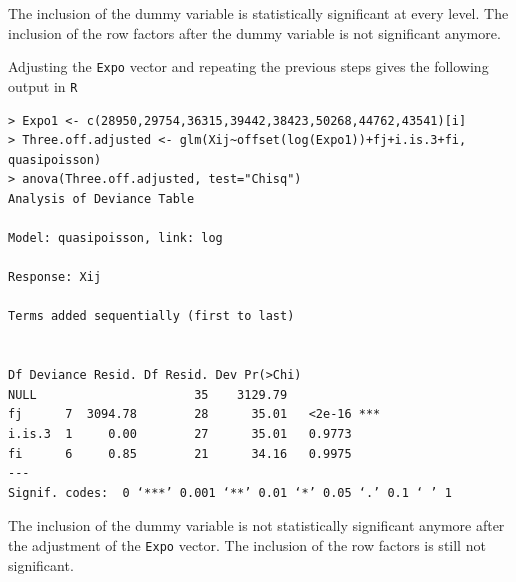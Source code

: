 \documentclass[11pt]{article}
\begin{document}
The inclusion of the dummy variable is statistically significant at every level. The inclusion of the row factors after the dummy variable is not significant anymore. 

Adjusting the \verb|Expo| vector and repeating the previous steps gives the following output in \verb|R|

\begin{verbatim}
> Expo1 <- c(28950,29754,36315,39442,38423,50268,44762,43541)[i]
> Three.off.adjusted <- glm(Xij~offset(log(Expo1))+fj+i.is.3+fi, quasipoisson)
> anova(Three.off.adjusted, test="Chisq")
Analysis of Deviance Table

Model: quasipoisson, link: log

Response: Xij

Terms added sequentially (first to last)


Df Deviance Resid. Df Resid. Dev Pr(>Chi)    
NULL                      35    3129.79             
fj      7  3094.78        28      35.01   <2e-16 ***
i.is.3  1     0.00        27      35.01   0.9773    
fi      6     0.85        21      34.16   0.9975    
---
Signif. codes:  0 ‘***’ 0.001 ‘**’ 0.01 ‘*’ 0.05 ‘.’ 0.1 ‘ ’ 1

\end{verbatim}
The inclusion of the dummy variable is not statistically significant anymore after the adjustment of the \verb|Expo| vector. The inclusion of the row factors is still not significant.
\end{document}

